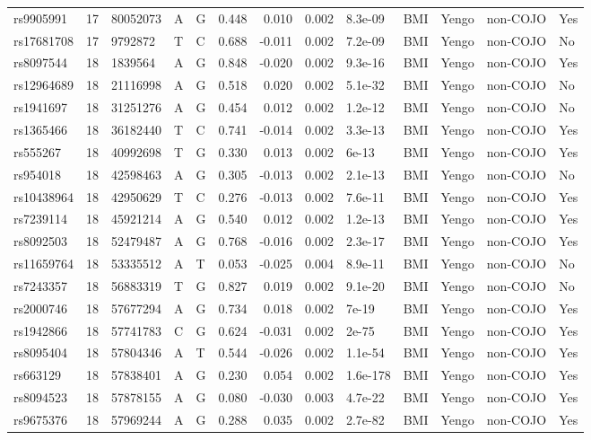 \documentclass[11pt,twoside]{bristolthesis}
\begin{document}
\begin{longtable}[t]{lrlllrrrlllll}
\addlinespace
rs9905991 & 17 & 80052073 & A & G & 0.448 & 0.010 & 0.002 & 8.3e-09 & BMI & Yengo & non-COJO & Yes\\
rs17681708 & 17 & 9792872 & T & C & 0.688 & -0.011 & 0.002 & 7.2e-09 & BMI & Yengo & non-COJO & No\\
rs8097544 & 18 & 1839564 & A & G & 0.848 & -0.020 & 0.002 & 9.3e-16 & BMI & Yengo & non-COJO & Yes\\
rs12964689 & 18 & 21116998 & A & G & 0.518 & 0.020 & 0.002 & 5.1e-32 & BMI & Yengo & non-COJO & No\\
rs1941697 & 18 & 31251276 & A & G & 0.454 & 0.012 & 0.002 & 1.2e-12 & BMI & Yengo & non-COJO & No\\
\addlinespace
rs1365466 & 18 & 36182440 & T & C & 0.741 & -0.014 & 0.002 & 3.3e-13 & BMI & Yengo & non-COJO & Yes\\
rs555267 & 18 & 40992698 & T & G & 0.330 & 0.013 & 0.002 & 6e-13 & BMI & Yengo & non-COJO & Yes\\
rs954018 & 18 & 42598463 & A & G & 0.305 & -0.013 & 0.002 & 2.1e-13 & BMI & Yengo & non-COJO & No\\
rs10438964 & 18 & 42950629 & T & C & 0.276 & -0.013 & 0.002 & 7.6e-11 & BMI & Yengo & non-COJO & Yes\\
rs7239114 & 18 & 45921214 & A & G & 0.540 & 0.012 & 0.002 & 1.2e-13 & BMI & Yengo & non-COJO & Yes\\
\addlinespace
rs8092503 & 18 & 52479487 & A & G & 0.768 & -0.016 & 0.002 & 2.3e-17 & BMI & Yengo & non-COJO & Yes\\
rs11659764 & 18 & 53335512 & A & T & 0.053 & -0.025 & 0.004 & 8.9e-11 & BMI & Yengo & non-COJO & No\\
rs7243357 & 18 & 56883319 & T & G & 0.827 & 0.019 & 0.002 & 9.1e-20 & BMI & Yengo & non-COJO & No\\
rs2000746 & 18 & 57677294 & A & G & 0.734 & 0.018 & 0.002 & 7e-19 & BMI & Yengo & non-COJO & Yes\\
rs1942866 & 18 & 57741783 & C & G & 0.624 & -0.031 & 0.002 & 2e-75 & BMI & Yengo & non-COJO & Yes\\
\addlinespace
rs8095404 & 18 & 57804346 & A & T & 0.544 & -0.026 & 0.002 & 1.1e-54 & BMI & Yengo & non-COJO & Yes\\
rs663129 & 18 & 57838401 & A & G & 0.230 & 0.054 & 0.002 & 1.6e-178 & BMI & Yengo & non-COJO & Yes\\
rs8094523 & 18 & 57878155 & A & G & 0.080 & -0.030 & 0.003 & 4.7e-22 & BMI & Yengo & non-COJO & Yes\\
rs9675376 & 18 & 57969244 & A & G & 0.288 & 0.035 & 0.002 & 2.7e-82 & BMI & Yengo & non-COJO & Yes\\

\end{longtable}
\end{document}
